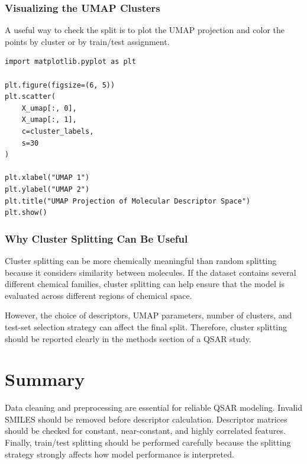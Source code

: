 \documentclass[11pt]{report}
\newenvironment{Important note}{\begin{quote}\color{red}\textbf{Important note:} }{\end{quote}}
\begin{document}
\subsubsection*{Visualizing the UMAP Clusters}

A useful way to check the split is to plot the UMAP projection and color the points by cluster or by train/test assignment.

\begin{lstlisting}[style=pythonstyle, caption={Visualizing UMAP clusters.}]
import matplotlib.pyplot as plt

plt.figure(figsize=(6, 5))
plt.scatter(
    X_umap[:, 0],
    X_umap[:, 1],
    c=cluster_labels,
    s=30
)

plt.xlabel("UMAP 1")
plt.ylabel("UMAP 2")
plt.title("UMAP Projection of Molecular Descriptor Space")
plt.show()
\end{lstlisting}

\subsubsection*{Why Cluster Splitting Can Be Useful}

Cluster splitting can be more chemically meaningful than random splitting because it considers similarity between molecules. If the dataset contains several different chemical families, cluster splitting can help ensure that the model is evaluated across different regions of chemical space.

However, the choice of descriptors, UMAP parameters, number of clusters, and test-set selection strategy can affect the final split. Therefore, cluster splitting should be reported clearly in the methods section of a QSAR study.


\section{Summary}

Data cleaning and preprocessing are essential for reliable QSAR modeling. Invalid SMILES should be removed before descriptor calculation. Descriptor matrices should be checked for constant, near-constant, and highly correlated features. Finally, train/test splitting should be performed carefully because the splitting strategy strongly affects how model performance is interpreted.
\end{document}
